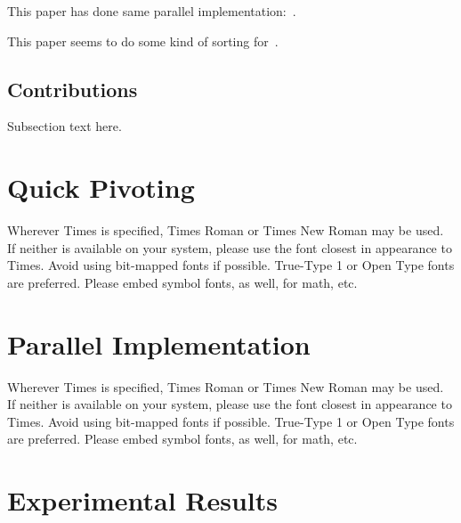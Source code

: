 \documentclass[10pt, conference, compsocconf]{IEEEtran}
\begin{document}
\cite{rajasekaran2006novel}

This paper has done same parallel implementation:~\cite{soliman2008memory}.

This paper seems to do some kind of sorting for~\cite{zhou1995parallel}.

\subsection{Contributions}
Subsection text here.


\section{Quick Pivoting}
Wherever Times is specified, Times Roman or Times New Roman may be used. If neither is available on your system, please use the font closest in appearance to Times. Avoid using bit-mapped fonts if possible. True-Type 1 or Open Type fonts are preferred. Please embed symbol fonts, as well, for math, etc.




\section{Parallel Implementation}
Wherever Times is specified, Times Roman or Times New Roman may be used. If neither is available on your system, please use the font closest in appearance to Times. Avoid using bit-mapped fonts if possible. True-Type 1 or Open Type fonts are preferred. Please embed symbol fonts, as well, for math, etc.



\section{Experimental Results}

%
%
\end{document}
